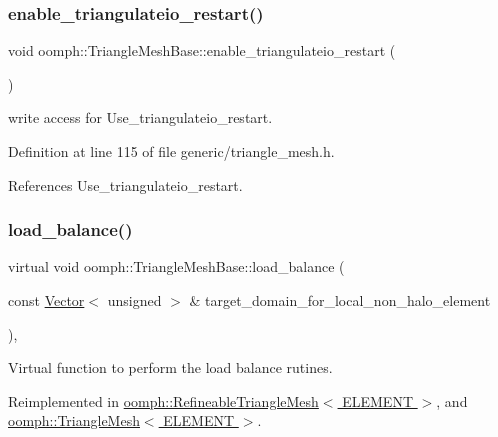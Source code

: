 \subsubsection{\texorpdfstring{enable\+\_\+triangulateio\+\_\+restart()}{enable\_triangulateio\_restart()}}
{\footnotesize\ttfamily void oomph\+::\+Triangle\+Mesh\+Base\+::enable\+\_\+triangulateio\+\_\+restart (\begin{DoxyParamCaption}{ }\end{DoxyParamCaption})\hspace{0.3cm}{\ttfamily [inline]}}



write access for Use\+\_\+triangulateio\+\_\+restart. 



Definition at line 115 of file generic/triangle\+\_\+mesh.\+h.



References Use\+\_\+triangulateio\+\_\+restart.

\mbox{\label{classoomph_1_1TriangleMeshBase_ad6e2c45db7c67e5a6fd063f0ea9bbfe7}} 
\subsubsection{\texorpdfstring{load\+\_\+balance()}{load\_balance()}}
{\footnotesize\ttfamily virtual void oomph\+::\+Triangle\+Mesh\+Base\+::load\+\_\+balance (\begin{DoxyParamCaption}\item[{const \hyperlink{classoomph_1_1Vector}{Vector}$<$ unsigned $>$ \&}]{target\+\_\+domain\+\_\+for\+\_\+local\+\_\+non\+\_\+halo\+\_\+element }\end{DoxyParamCaption})\hspace{0.3cm}{\ttfamily [inline]}, {\ttfamily [virtual]}}



Virtual function to perform the load balance rutines. 



Reimplemented in \hyperlink{classoomph_1_1RefineableTriangleMesh_aaffa40b7d036f8ed8639bf9396f1088a}{oomph\+::\+Refineable\+Triangle\+Mesh$<$ E\+L\+E\+M\+E\+N\+T $>$}, and \hyperlink{classoomph_1_1TriangleMesh_a712bfd68d4b55e9c475347c0146fc8ac}{oomph\+::\+Triangle\+Mesh$<$ E\+L\+E\+M\+E\+N\+T $>$}.



